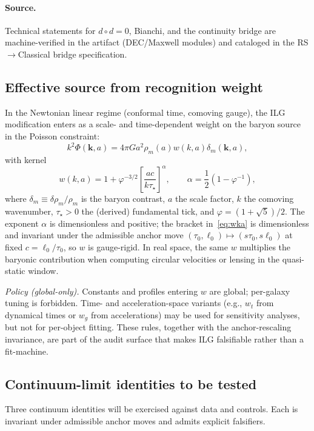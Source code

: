 \documentclass[11pt]{article}
\begin{document}
\paragraph{Source.} Technical statements for $d\circ d=0$, Bianchi, and the continuity bridge are machine-verified in the artifact (DEC/Maxwell modules) and cataloged in the RS$\to$Classical bridge specification. 

\subsection{Effective source from recognition weight}
In the Newtonian linear regime (conformal time, comoving gauge), the ILG modification enters as a scale- and time-dependent weight on the baryon source in the Poisson constraint:
\begin{equation}\label{eq:poisson-ilg}
k^2\Phi(\mathbf{k},a) = 4\pi G a^2\rho_m(a) w(k,a)\delta_m(\mathbf{k},a),
\end{equation}
with kernel
\begin{equation}\label{eq:wka}
w(k,a) = 1+\varphi^{-3/2}\left[\frac{a c}{k\tau_\star}\right]^{\alpha}, 
\qquad \alpha = \frac{1}{2}\left(1-\varphi^{-1}\right),
\end{equation}
where $\delta_m\equiv \delta\rho_m/\rho_m$ is the baryon contrast, $a$ the scale factor, $k$ the comoving wavenumber, $\tau_\star>0$ the (derived) fundamental tick, and $\varphi=(1+\sqrt{5})/2$. The exponent $\alpha$ is dimensionless and positive; the bracket in~\eqref{eq:wka} is dimensionless and invariant under the admissible anchor move $(\tau_0,\ell_0)\mapsto (s\tau_0, s\ell_0)$ at fixed $c=\ell_0/\tau_0$, so $w$ is gauge-rigid. In real space, the same $w$ multiplies the baryonic contribution when computing circular velocities or lensing in the quasi-static window.

\emph{Policy (global-only).} Constants and profiles entering $w$ are global; per-galaxy tuning is forbidden. Time- and acceleration-space variants (e.g., $w_t$ from dynamical times or $w_g$ from accelerations) may be used for sensitivity analyses, but not for per-object fitting. These rules, together with the anchor-rescaling invariance, are part of the audit surface that makes ILG falsifiable rather than a fit-machine. 

\subsection{Continuum-limit identities to be tested}
Three continuum identities will be exercised against data and controls. Each is invariant under admissible anchor moves and admits explicit falsifiers.
\end{document}
